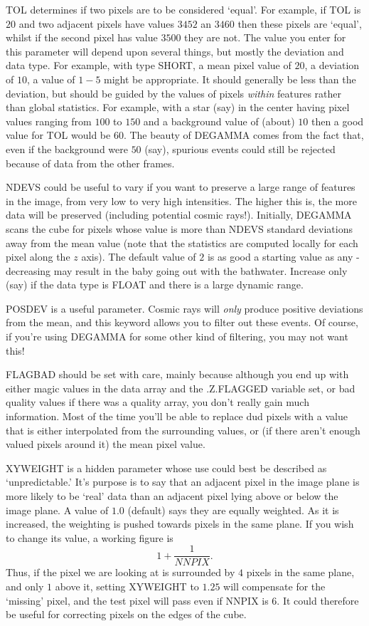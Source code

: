 TOL determines if two pixels are to be considered `equal'. For example, if TOL
is $20$ and two adjacent pixels have values $3452$ an $3460$ then these pixels
are `equal', whilst if the second pixel has value $3500$ they are not. The
value you enter for this parameter will depend upon several things, but mostly
the deviation and data type. For example, with type SHORT, a mean pixel value
of $20$, a deviation of $10$, a value of $1-5$ might be appropriate. It should
generally be less than the deviation, but should be guided by the values of
pixels {\em within} features rather than global statistics. For example, with
a star (say) in the center having pixel values ranging from $100$ to $150$ and
a background value of (about) $10$ then a good value for TOL would be $60$. The
beauty of DEGAMMA comes from the fact that, even if the background were $50$
(say), spurious events could still be rejected because of data from the other
frames.

NDEVS could be useful to vary if you want to preserve a large range of features
in the image, from very low to very high intensities. The higher this is, the
more data will be preserved (including potential cosmic rays!).  Initially,
DEGAMMA scans the cube for pixels whose value is more than NDEVS standard
deviations away from the mean value (note that the statistics are computed
locally for each pixel along the $z$ axis). The default value of $2$
is as good a starting value as any - decreasing may result in the baby going
out with the bathwater. Increase only (say) if the data type is FLOAT and there
is a large dynamic range.

POSDEV is a useful parameter. Cosmic rays will {\em only} produce positive
deviations from the mean, and this keyword allows you to filter out these
events. Of course, if you're using DEGAMMA for some other kind of filtering,
you may not want this!

FLAGBAD should be set with care, mainly because although you end up with either
magic values in the data array and the .Z.FLAGGED variable set, or bad quality
values if there was a quality array, you don't really gain much information.
Most of the time you'll be able to replace dud pixels with a value that is
either interpolated from the surrounding values, or (if there aren't enough
valued pixels around it) the mean pixel value.

XYWEIGHT is a hidden parameter whose use could best be described as
`unpredictable.' It's purpose is to say that an adjacent pixel in the
image plane is more likely to be `real' data than an adjacent pixel lying above
or below the image plane. A value of $1.0$ (default) says they are equally
weighted. As it is increased, the weighting is pushed towards pixels in the
same plane. If you wish to change its value, a working figure is
\begin{displaymath}
1+\frac{1}{NNPIX}.
\end{displaymath}
Thus, if the pixel we are looking at  is surrounded by $4$ pixels in the same
plane, and only $1$ above it, setting XYWEIGHT to $1.25$ will compensate for
the `missing' pixel, and the test pixel will pass even if NNPIX is $6$. It
could therefore be useful for correcting pixels on the edges of the cube.

